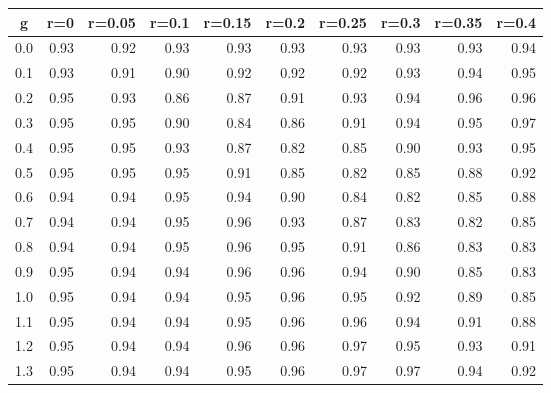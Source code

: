 %
\begin{table}[!tbp]
 \begin{center}
 \begin{tabular}{rrrrrrrrrr}\hline\hline
\multicolumn{1}{c}{g}&\multicolumn{1}{c}{r=0}&\multicolumn{1}{c}{r=0.05}&\multicolumn{1}{c}{r=0.1}&\multicolumn{1}{c}{r=0.15}&\multicolumn{1}{c}{r=0.2}&\multicolumn{1}{c}{r=0.25}&\multicolumn{1}{c}{r=0.3}&\multicolumn{1}{c}{r=0.35}&\multicolumn{1}{c}{r=0.4}\tabularnewline
\hline
0.0&0.93&0.92&0.93&0.93&0.93&0.93&0.93&0.93&0.94\tabularnewline
0.1&0.93&0.91&0.90&0.92&0.92&0.92&0.93&0.94&0.95\tabularnewline
0.2&0.95&0.93&0.86&0.87&0.91&0.93&0.94&0.96&0.96\tabularnewline
0.3&0.95&0.95&0.90&0.84&0.86&0.91&0.94&0.95&0.97\tabularnewline
0.4&0.95&0.95&0.93&0.87&0.82&0.85&0.90&0.93&0.95\tabularnewline
0.5&0.95&0.95&0.95&0.91&0.85&0.82&0.85&0.88&0.92\tabularnewline
0.6&0.94&0.94&0.95&0.94&0.90&0.84&0.82&0.85&0.88\tabularnewline
0.7&0.94&0.94&0.95&0.96&0.93&0.87&0.83&0.82&0.85\tabularnewline
0.8&0.94&0.94&0.95&0.96&0.95&0.91&0.86&0.83&0.83\tabularnewline
0.9&0.95&0.94&0.94&0.96&0.96&0.94&0.90&0.85&0.83\tabularnewline
1.0&0.95&0.94&0.94&0.95&0.96&0.95&0.92&0.89&0.85\tabularnewline
1.1&0.95&0.94&0.94&0.95&0.96&0.96&0.94&0.91&0.88\tabularnewline
1.2&0.95&0.94&0.94&0.96&0.96&0.97&0.95&0.93&0.91\tabularnewline
1.3&0.95&0.94&0.94&0.95&0.96&0.97&0.97&0.94&0.92\tabularnewline
\hline
\end{tabular}

\end{center}

\end{table}

